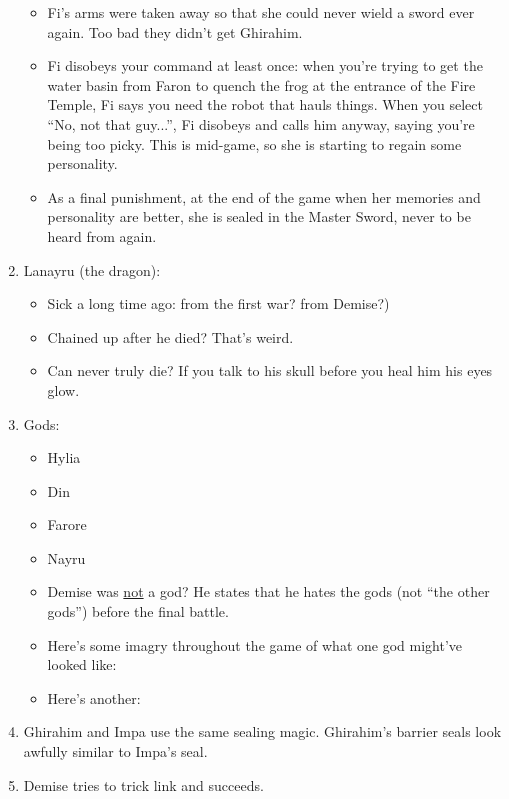 \begin{enumerate}
{\begin{itemize}
			\item{Fi's arms were taken away so that she could never wield a sword ever again. Too bad they didn't get Ghirahim.}
			\item{Fi disobeys your command at least once: when you're trying to get the water basin from Faron to quench the frog at the entrance of the Fire Temple, Fi says you need the robot that hauls things. When you select ``No, not that guy...'', Fi disobeys and calls him anyway, saying you're being too picky. This is mid-game, so she is starting to regain some personality.}
			\item{As a final punishment, at the end of the game when her memories and personality are better, she is sealed in the Master Sword, never to be heard from again.}
		\end{itemize}
	}
	\item{Lanayru (the dragon):
		\begin{itemize}
			\item{Sick a long time ago: from the first war? from Demise?)}
			\item{Chained up after he died? That's weird.}
			\item{Can never truly die? If you talk to his skull before you heal him his eyes glow.}
		\end{itemize}
		}
		
	\item{Gods:
		\begin{itemize}
			\item{Hylia}
			\item{Din}
			\item{Farore}
			\item{Nayru}
			\item{Demise was \ul{not} a god? He states that he hates the gods (not ``the other gods'') before the final battle.}
			\item{Here's some imagry throughout the game of what one god might've looked like:
				}
			\item{Here's another:
				}
		\end{itemize}
	}
	\item{Ghirahim and Impa use the same sealing magic. Ghirahim's barrier seals look awfully similar to Impa's seal.
	}
	\item{Demise tries to trick link and succeeds.}
\end{enumerate}

